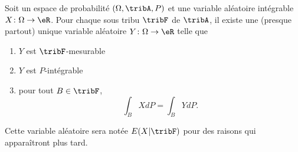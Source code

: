 \begin{theoremDef}     \label{ThoMWfDPQ}
	Soit un espace de probabilité \( (\Omega,\tribA,P)\) et une variable aléatoire intégrable \( X\colon \Omega\to \eR\). Pour chaque sous tribu \( \tribF\) de \( \tribA\), il existe une (presque partout) unique variable aléatoire \( Y\colon \Omega\to \eR\) telle que
	\begin{enumerate}
		\item
		      \( Y\) est \( \tribF\)-mesurable
		\item
		      \( Y\) est \( P\)-intégrable
		\item
		      pour tout \( B\in\tribF\),
		      \begin{equation}        \label{EqBwBkgE}
			      \int_{B}XdP=\int_B YdP.
		      \end{equation}
	\end{enumerate}
	Cette variable aléatoire sera notée \( E(X|\tribF)\) pour des raisons qui apparaîtront plus tard.
\end{theoremDef}

